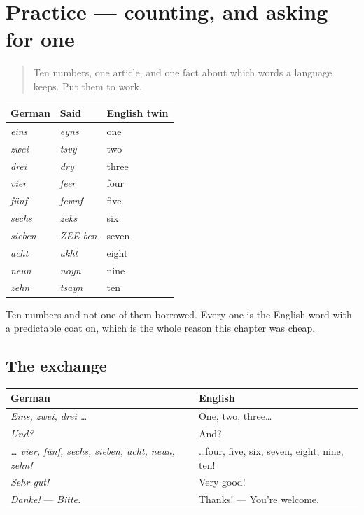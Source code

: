 \section[Practice]{Practice — counting, and asking for one}

\label{lesson:GE-C06-practice}



\begin{quote}
Ten numbers, one article, and one fact about which words a language keeps. Put them to work.
\end{quote}

\begin{grammarlens}[title={Grammar Lens: the ten, and what each one cost}]
\noindent
\begin{tabularx}{\linewidth}{@{}>{\raggedright\arraybackslash}X>{\raggedright\arraybackslash}X>{\raggedright\arraybackslash}X@{}}
\toprule
\textbf{German} & \textbf{Said} & \textbf{English twin} \\
\midrule
\emph{eins} & \emph{eyns} & one \\
\emph{zwei} & \emph{tsvy} & two \\
\emph{drei} & \emph{dry} & three \\
\emph{vier} & \emph{feer} & four \\
\emph{fünf} & \emph{fewnf} & five \\
\emph{sechs} & \emph{zeks} & six \\
\emph{sieben} & \emph{ZEE-ben} & seven \\
\emph{acht} & \emph{akht} & eight \\
\emph{neun} & \emph{noyn} & nine \\
\emph{zehn} & \emph{tsayn} & ten \\
\bottomrule
\end{tabularx}

Ten numbers and not one of them borrowed. Every one is the English word with a predictable coat on, which is the whole reason this chapter was cheap.
\end{grammarlens}

\subsection*{The exchange}
\noindent
\begin{tabularx}{\linewidth}{@{}>{\raggedright\arraybackslash}X>{\raggedright\arraybackslash}X@{}}
\toprule
\textbf{German} & \textbf{English} \\
\midrule
\emph{Eins, zwei, drei …} & One, two, three… \\
\emph{Und?} & And? \\
\emph{… vier, fünf, sechs, sieben, acht, neun, zehn!} & …four, five, six, seven, eight, nine, ten! \\
\emph{Sehr gut!} & Very good! \\
\emph{Danke!} — \emph{Bitte.} & Thanks! — You're welcome. \\
\bottomrule
\end{tabularx}

